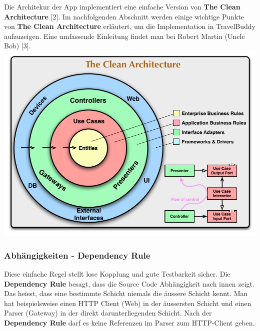 \documentclass[a4paper,10pt,xetex]{article}
\begin{document}
Die Architekur der App implementiert eine einfache Version von \textbf{The Clean Architecture} [2]. Im nachfolgenden Abschnitt werden einige wichtige Punkte von \textbf{The Clean Architecture} erläutert, um die Implementation in TravelBuddy aufzuzeigen. Eine umfassende Einleitung findet man bei Robert Martin (Uncle Bob) [3].
{\includegraphics{cleanarchitecture}}
\subsubsection{Abhängigkeiten - Dependency Rule}\label{dependencyrule}
Diese einfache Regel stellt lose Kopplung und gute Testbarkeit sicher. Die \textbf{Dependency Rule} besagt, dass die Source Code Abhängigkeit nach innen zeigt. Das heisst, dass eine bestimmte Schicht niemals die äussere Schicht kennt. Man hat beispielsweise einen HTTP Client (Web) in der äussersten Schicht und einen Parser (Gateway) in der direkt darunterliegenden Schicht. Nach der \textbf{Dependency Rule} darf es keine Referenzen im Parser zum HTTP-Client geben.
\end{document}
